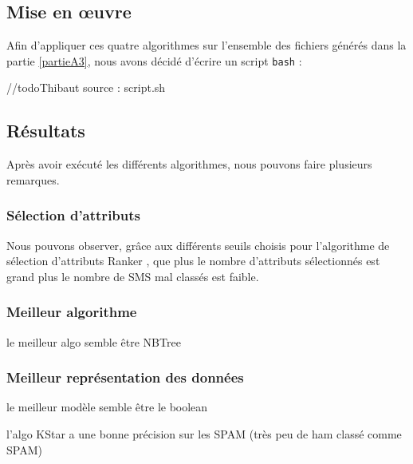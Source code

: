 \subsection{Mise en œuvre}
Afin d'appliquer ces quatre algorithmes sur l'ensemble des fichiers générés dans la partie \vref{partieA3}, nous avons décidé d'écrire un script \texttt{bash} :

//todo{Thibaut} source : script.sh

\subsection{Résultats}

Après avoir exécuté les différents algorithmes, nous pouvons faire plusieurs remarques.

\subsubsection{Sélection d'attributs}
Nous pouvons observer, grâce aux différents seuils choisis pour l'algorithme de sélection d'attributs \og Ranker \fg{}, que plus le nombre d'attributs sélectionnés est grand plus le nombre de SMS mal classés est faible.

\subsubsection{Meilleur algorithme}
    le meilleur algo semble être NBTree

\subsubsection{Meilleur représentation des données}
    le meilleur modèle semble être le boolean 

    l'algo KStar a une bonne précision sur les SPAM (très peu de ham classé comme SPAM)



